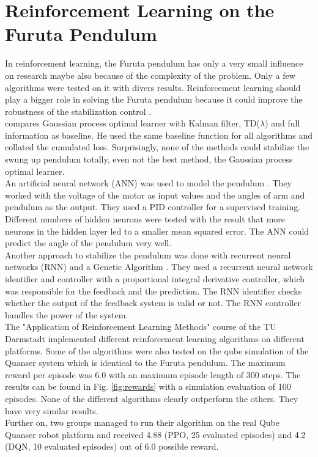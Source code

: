 \section{Reinforcement Learning on the Furuta Pendulum}
In reinforcement learning, the Furuta pendulum has only a very small influence 
on research maybe also because of the complexity of the 
problem. Only a few algorithms were tested on it with divers results. 
Reinforcement learning should play a bigger role in solving the Furuta pendulum 
because it could improve the robustness of the stabilization control 
\citep{wang2004minimum}.\\
\cite{hennig2011optimal} compares Gaussian process optimal learner with 
Kalman filter, TD($\lambda$) and full information as baseline. He used the same 
baseline function for all algorithms and collated the cumulated loss. 
Surprisingly, none of the methods could stabilize the swung up pendulum 
totally, even not the best method, the Gaussian process optimal learner.\\
An artificial neural network (ANN) was used to model the pendulum 
\citep{quyen2012rotary}. They worked with the voltage of the motor as input 
values and the angles of arm and pendulum as the output. They used a PID 
controller for a supervised training. Different numbers of 
hidden neurons were tested with the result that more neurons in the hidden 
layer led to a smaller mean squared error. The ANN could predict the angle of 
the pendulum very well.\\
Another approach to stabilize the pendulum was done with recurrent neural 
networks (RNN) and a Genetic Algorithm 
\citep{shojaei2011hybrid}. They used a recurrent neural network identifier and 
controller with a proportional integral derivative controller, which was 
responsible for the feedback and the prediction. The RNN identifier checks 
whether the output of the feedback system is valid or not. The RNN controller 
handles the power of the system.\\
The "Application of Reinforcement Learning Methods" course of the TU Darmstadt 
implemented different reinforcement learning algorithms on different platforms. 
Some of the algorithms were also tested on the qube simulation of the Quanser 
system which is identical to the Furuta pendulum. The maximum reward per 
episode was 6.0 with an maximum episode length of 300 steps. The results can be 
found in Fig. \ref{fig:rewards} with a simulation evaluation of 100 episodes. 
None of the different algorithms clearly outperform the others. They have very 
similar results.\\
Further on, two groups managed to run their algorithm on the real Qube Quanser 
robot platform and received 4.88 (PPO, 25 evaluated episodes) and 4.2 (DQN, 10 
evaluated episodes) out of 6.0 possible reward.  

